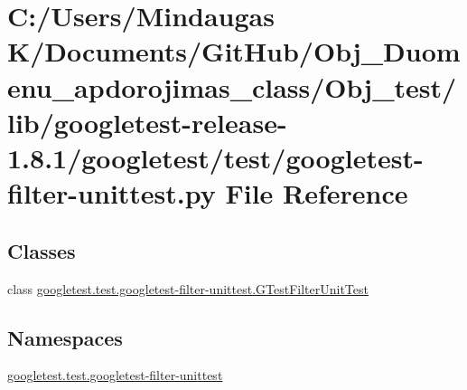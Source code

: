 \hypertarget{_obj__test_2lib_2googletest-release-1_88_81_2googletest_2test_2googletest-filter-unittest_8py}{}\section{C\+:/\+Users/\+Mindaugas K/\+Documents/\+Git\+Hub/\+Obj\+\_\+\+Duomenu\+\_\+apdorojimas\+\_\+class/\+Obj\+\_\+test/lib/googletest-\/release-\/1.8.1/googletest/test/googletest-\/filter-\/unittest.py File Reference}
\label{_obj__test_2lib_2googletest-release-1_88_81_2googletest_2test_2googletest-filter-unittest_8py}
\subsection*{Classes}
\begin{DoxyCompactItemize}
\item 
class \mbox{\hyperlink{classgoogletest_1_1test_1_1googletest-filter-unittest_1_1_g_test_filter_unit_test}{googletest.\+test.\+googletest-\/filter-\/unittest.\+G\+Test\+Filter\+Unit\+Test}}
\end{DoxyCompactItemize}
\subsection*{Namespaces}
\begin{DoxyCompactItemize}
\item 
 \mbox{\hyperlink{namespacegoogletest_1_1test_1_1googletest-filter-unittest}{googletest.\+test.\+googletest-\/filter-\/unittest}}
\end{DoxyCompactItemize}
